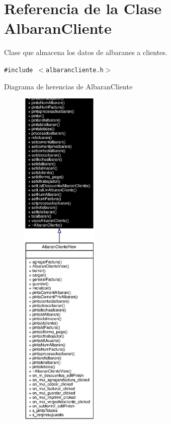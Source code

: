 \section{Referencia de la Clase Albaran\-Cliente}
\label{classAlbaranCliente}
Clase que almacena los datos de albaranes a clientes.  


{\tt \#include $<$albarancliente.h$>$}

Diagrama de herencias de Albaran\-Cliente\begin{figure}[H]
\begin{center}
\leavevmode
\includegraphics[width=105pt]{classAlbaranCliente__inherit__graph}
\end{center}
\end{figure}

